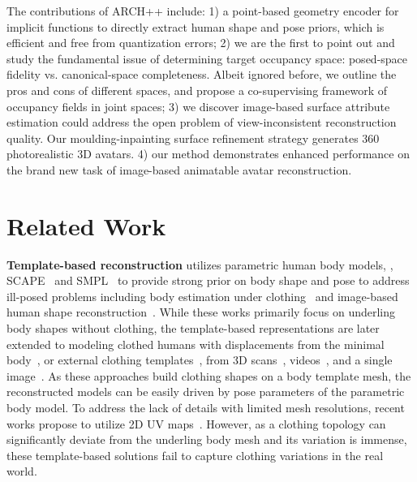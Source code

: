\documentclass[10pt,twocolumn,letterpaper]{article}
\newcommand{\beforesection}{\vspace{-1.5mm}}
\newcommand{\aftersection}{\vspace{-1.5mm}}
\begin{document}
The contributions of ARCH++ include: 
1) a point-based geometry encoder for implicit functions to directly extract human shape and pose priors, which is efficient and free from quantization errors;
2) we are the first to point out and study the fundamental issue of determining target occupancy space: posed-space fidelity vs. canonical-space completeness. Albeit ignored before, we outline the pros and cons of different spaces, and propose a co-supervising framework of occupancy fields in joint spaces;
3) we discover image-based surface attribute estimation could address the open problem of view-inconsistent reconstruction quality. Our moulding-inpainting surface refinement strategy generates 360 photorealistic 3D avatars.
4) our method demonstrates enhanced performance on the brand new task of image-based animatable avatar reconstruction.

\beforesection\vspace{1mm}
\section{Related Work} \label{sec:related}
\aftersection\vspace{1mm}

\textbf{Template-based reconstruction} utilizes parametric human body models, \eg, SCAPE~\cite{angelov05} and SMPL~\cite{loper2015smpl} to provide strong prior on body shape and pose to address ill-posed problems including body estimation under clothing~\cite{yangClothMocapECCV16, zhang-CVPR17} and image-based human shape reconstruction~\cite{bogo2016keep, lassner2017unite, kanazawa2018hmr, HoloPoseCVPR19, CMRCVPR19, xiang2019monocular, SPINICCV19, DenseRaCICCV19}. While these works primarily focus on underling body shapes without clothing, the template-based representations are later extended to modeling clothed humans with displacements from the minimal body~\cite{ClothCapTOG17}, or external clothing templates~\cite{MulGarmentNetICCV19}, from 3D scans~\cite{yang2018analyzing, ClothCapTOG17}, videos~\cite{Video3DPeopleCVPR18, marc2020deepcap}, and a single image~\cite{Video3DClothPeopleCVPR19, MulGarmentNetICCV19, jiang2020bcnet}. As these approaches build clothing shapes on a body template mesh, the reconstructed models can be easily driven by pose parameters of the parametric body model. To address the lack of details with limited mesh resolutions, recent works propose to utilize 2D UV maps~\cite{laehnerECCV18,Tex2ShapeICCV19}. However, as a clothing topology can significantly deviate from the underling body mesh and its variation is immense, these template-based solutions fail to capture clothing variations in the real world.
\end{document}
